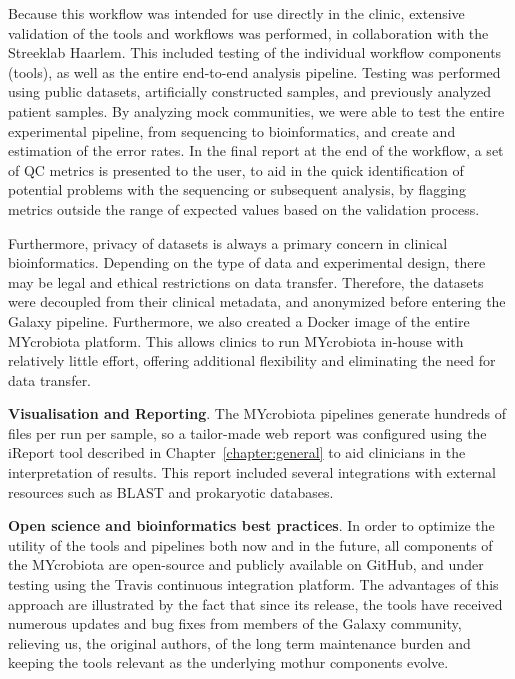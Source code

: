 Because this workflow was intended for use directly in the clinic, extensive validation of the tools and workflows was performed, in collaboration with the Streeklab Haarlem. This included testing of the individual workflow components (tools), as well as the entire end-to-end analysis pipeline. Testing was performed using public datasets, artificially constructed samples, and previously analyzed patient samples. By analyzing mock communities, we were able to test the entire experimental pipeline, from sequencing to bioinformatics, and create and estimation of the error rates. In the final report at the end of the workflow, a set of QC metrics is presented to the user, to aid in the quick identification of potential problems with the sequencing or subsequent analysis, by flagging metrics outside the range of expected values based on the validation process.

Furthermore, privacy of datasets is always a primary concern in clinical bioinformatics. Depending on the type of data and experimental design, there may be legal and ethical restrictions on data transfer. Therefore, the datasets were decoupled from their clinical metadata, and anonymized before entering the Galaxy pipeline. Furthermore, we also created a Docker \cite{url-docker} image of the entire MYcrobiota platform. This allows clinics to run MYcrobiota in-house with relatively little effort, offering additional flexibility and eliminating the need for data transfer.

\textbf{Visualisation and Reporting}. The MYcrobiota pipelines generate hundreds of files per run per sample, so a tailor-made web report was configured using the iReport tool described in Chapter~\ref{chapter:general} to aid clinicians in the interpretation of results. This report included several integrations with external resources such as BLAST and prokaryotic databases.

\textbf{Open science and bioinformatics best practices}. In order to optimize the utility of the tools and pipelines both now and in the future, all components of the MYcrobiota are open-source and publicly available on GitHub, and under testing using the Travis continuous integration platform. The advantages of this approach are illustrated by the fact that since its release, the tools have received numerous updates and bug fixes from members of the Galaxy community, relieving us, the original authors, of the long term maintenance burden and keeping the tools relevant as the underlying mothur components evolve.


